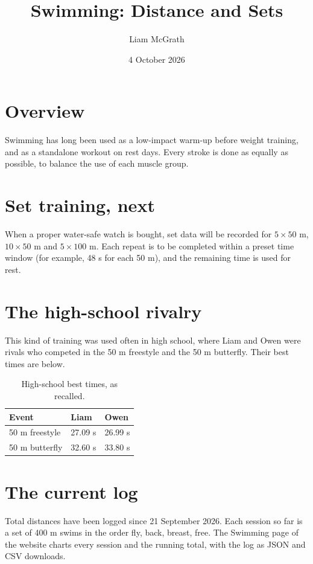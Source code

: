 \documentclass[11pt]{article}
\title{Swimming: Distance and Sets}
\author{Liam McGrath}
\date{4 October 2026}
\begin{document}
\maketitle

\section{Overview}
Swimming has long been used as a low-impact warm-up before weight training, and as a standalone workout on rest days. Every stroke is done as equally as possible, to balance the use of each muscle group.

\section{Set training, next}
When a proper water-safe watch is bought, set data will be recorded for $5 \times 50$ m, $10 \times 50$ m and $5 \times 100$ m. Each repeat is to be completed within a preset time window (for example, 48 s for each 50 m), and the remaining time is used for rest.

\section{The high-school rivalry}
This kind of training was used often in high school, where Liam and Owen were rivals who competed in the 50 m freestyle and the 50 m butterfly. Their best times are below.

\begin{table}[htbp]
\centering
\begin{tabular}{lll}
\hline
Event & Liam & Owen \\
\hline
50 m freestyle & 27.09 s & 26.99 s \\
50 m butterfly & 32.60 s & 33.80 s \\
\hline
\end{tabular}
\caption{High-school best times, as recalled.}
\end{table}

\section{The current log}
Total distances have been logged since 21 September 2026. Each session so far is a set of 400 m swims in the order fly, back, breast, free. The Swimming page of the website charts every session and the running total, with the log as JSON and CSV downloads.
\end{document}
